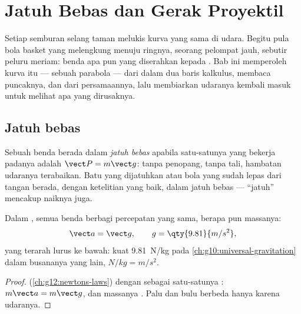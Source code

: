 \chapter{Jatuh Bebas dan Gerak Proyektil}\label{ch:g12:projectile-motion}

Setiap semburan selang taman melukis kurva yang sama di udara. Begitu pula
bola basket yang melengkung menuju ringnya, seorang pelompat jauh, sebutir
peluru meriam: benda apa pun yang diserahkan kepada . Bab ini
memperoleh kurva itu --- sebuah parabola --- dari  dalam
dua baris kalkulus, membaca puncaknya,  dan 
dari persamaannya, lalu membiarkan udaranya kembali masuk untuk melihat apa
yang dirusaknya.

\section{Jatuh bebas}

\begin{definition}\label{def:g12:projectile-motion:freefall}
Sebuah benda berada dalam \emph{jatuh bebas} apabila
satu-satunya  yang bekerja padanya adalah  $\vect P = m\vect g$:
tanpa penopang, tanpa tali, hambatan udaranya terabaikan. Batu yang
dijatuhkan atau bola yang sudah lepas dari tangan berada, dengan ketelitian
yang baik, dalam jatuh bebas --- ``jatuh'' mencakup naiknya juga.
\end{definition}

\begin{theorem}\label{thm:g12:projectile-motion:galileo}
Dalam , semua benda berbagi percepatan yang sama, berapa pun massanya:
\[
\vect a = \vect g, \qquad g = \qty{9.81}{m/s^2},
\]
yang terarah lurus ke bawah: kuat  \qty{9.81}{N/kg} pada
\cref{ch:g10:universal-gravitation} dalam busananya yang lain, $\unit{N/kg} = \unit{m/s^2}$.
\end{theorem}

\begin{proof}
 (\cref{ch:g12:newtons-laws}) dengan  sebagai
satu-satunya : $m\vect a = m\vect g$, dan massanya .
Palu dan bulu berbeda hanya karena udaranya.
\end{proof}

